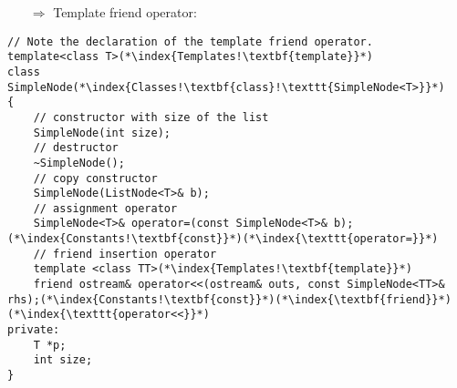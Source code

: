 \documentclass[10pt]{article}
\begin{document}
\begin{enumerate}
\item[$\Rightarrow$] Template friend operator:
\end{enumerate}
\begin{lstlisting}
// Note the declaration of the template friend operator.
template<class T>(*\index{Templates!\textbf{template}}*)
class SimpleNode(*\index{Classes!\textbf{class}!\texttt{SimpleNode<T>}}*)
{
    // constructor with size of the list
    SimpleNode(int size);
    // destructor
    ~SimpleNode();
    // copy constructor
    SimpleNode(ListNode<T>& b);
    // assignment operator
    SimpleNode<T>& operator=(const SimpleNode<T>& b);(*\index{Constants!\textbf{const}}*)(*\index{\texttt{operator=}}*)
    // friend insertion operator
    template <class TT>(*\index{Templates!\textbf{template}}*)
    friend ostream& operator<<(ostream& outs, const SimpleNode<TT>& rhs);(*\index{Constants!\textbf{const}}*)(*\index{\textbf{friend}}*)(*\index{\texttt{operator<<}}*)
private:
    T *p;
    int size;
}
\end{lstlisting}
%
%
\end{document}
